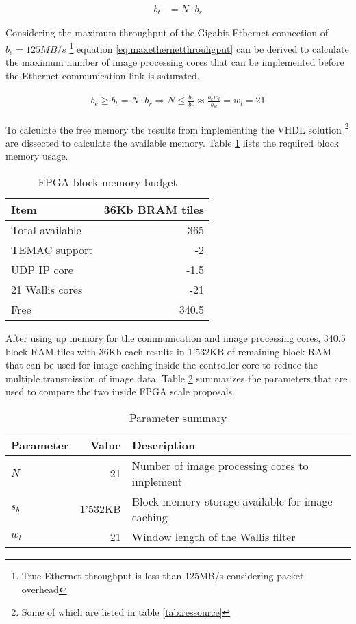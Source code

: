 \begin{align}
    b_t  & = N \cdot b_r
    \label{eq:scaledrealttotalhroughput}
\end{align}

Considering the maximum throughput of the Gigabit-Ethernet connection of
$b_e=125MB/s$ \footnote{True Ethernet throughput is less than 125MB/s
considering packet overhead} equation \ref{eq:maxethernetthrouhgput} can be derived to calculate the
maximum number of image processing cores that can be implemented before the
Ethernet communication link is saturated.

\begin{align}
    b_e \geq b_t = N \cdot b_r \Rightarrow N \leq \frac{b_e}{b_r} \approx 
    \frac{b_e w_l}{b_w} = w_l = 21
    \label{eq:maxethernetthrouhgput}
\end{align}

To calculate the free memory the results from implementing the VHDL solution
\footnote{Some of which are listed in table \ref{tab:ressource}} 
are dissected to calculate the available memory. Table \ref{tab:membudget}
lists the required block memory usage.

\begin{table}[h!]
    \centering
    \begin{tabular}{l r}
        \toprule
        Item & 36Kb BRAM tiles \footnotemark \\
        \midrule
        Total available & 365 \\
        TEMAC support & -2 \\
        UDP IP core & -1.5 \\
        21 Wallis cores & -21 \\
        \midrule
        Free & 340.5\\
        \bottomrule
    \end{tabular}
    \caption{FPGA block memory budget}
    \label{tab:membudget}
\end{table}

After using up memory for the communication and image processing cores, 340.5
block RAM tiles with 36Kb each results in 1'532KB of remaining block RAM that
can be used for image caching inside the controller core to reduce the multiple
transmission of image data. Table \ref{tab:parsum} summarizes the
parameters that are used to compare the two inside FPGA scale proposals.

\begin{table}[h!]
    \centering
    \begin{tabular}{l r l}
        \toprule
        Parameter & Value & Description\\
        \midrule
        $N$ & 21 & Number of image processing cores to implement \\
        $s_b$ & 1'532KB & Block memory storage available for image caching \\
        $w_l$ & 21 & Window length of the Wallis filter \\
        \bottomrule
    \end{tabular}
    \caption{Parameter summary}
    \label{tab:parsum}
\end{table}


